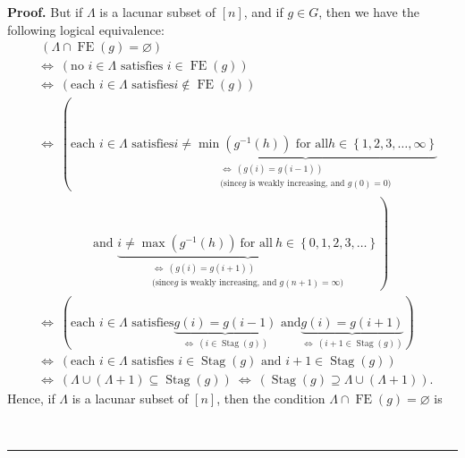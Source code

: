 \documentclass[numbers=enddot,12pt,final,onecolumn,notitlepage]{scrartcl}%
\theoremstyle{definition}
\newenvironment{proof}[1][Proof]{\noindent\textbf{#1.} }{\ \rule{0.5em}{0.5em}}
\begin{document}
\begin{proof}
But if $\Lambda$ is a lacunar subset of $\left[  n\right]  $, and if $g\in G$,
then we have the following logical equivalence:%
\begin{align*}
&  \ \left(  \Lambda\cap\operatorname*{FE}\left(  g\right)  =\varnothing
\right) \\
&  \Longleftrightarrow\ \left(  \text{no }i\in\Lambda\text{ satisfies }%
i\in\operatorname*{FE}\left(  g\right)  \right) \\
&  \Longleftrightarrow\ \left(  \text{each }i\in\Lambda\text{ satisfies
}i\notin\operatorname*{FE}\left(  g\right)  \right) \\
&  \Longleftrightarrow\ \left(  \text{each }i\in\Lambda\text{ satisfies
}\underbrace{i\neq\min\left(  g^{-1}\left(  h\right)  \right)  \text{ for all
}h\in\left\{  1,2,3,\ldots,\infty\right\}  }_{\substack{\Longleftrightarrow
\ \left(  g\left(  i\right)  =g\left(  i-1\right)  \right)  \\\text{(since
}g\text{ is weakly increasing, and }g\left(  0\right)  =0\text{)}}}\right. \\
&  \ \ \ \ \ \ \ \ \ \ \ \ \ \ \ \ \ \ \ \ \left.  \text{and }%
\underbrace{i\neq\max\left(  g^{-1}\left(  h\right)  \right)  \ \text{for
all}\ h\in\left\{  0,1,2,3,\ldots\right\}  }_{\substack{\Longleftrightarrow
\ \left(  g\left(  i\right)  =g\left(  i+1\right)  \right)  \\\text{(since
}g\text{ is weakly increasing, and }g\left(  n+1\right)  =\infty\text{)}%
}}\right) \\
&  \Longleftrightarrow\ \left(  \text{each }i\in\Lambda\text{ satisfies
}\underbrace{g\left(  i\right)  =g\left(  i-1\right)  }_{\Longleftrightarrow
\ \left(  i\in\operatorname*{Stag}\left(  g\right)  \right)  }\text{ and
}\underbrace{g\left(  i\right)  =g\left(  i+1\right)  }_{\Longleftrightarrow
\ \left(  i+1\in\operatorname*{Stag}\left(  g\right)  \right)  }\right) \\
&  \Longleftrightarrow\ \left(  \text{each }i\in\Lambda\text{ satisfies }%
i\in\operatorname*{Stag}\left(  g\right)  \text{ and }i+1\in
\operatorname*{Stag}\left(  g\right)  \right) \\
&  \Longleftrightarrow\ \left(  \Lambda\cup\left(  \Lambda+1\right)
\subseteq\operatorname*{Stag}\left(  g\right)  \right)  \ \Longleftrightarrow
\ \left(  \operatorname*{Stag}\left(  g\right)  \supseteq\Lambda\cup\left(
\Lambda+1\right)  \right)  .
\end{align*}
Hence, if $\Lambda$ is a lacunar subset of $\left[  n\right]  $, then the
condition $\Lambda\cap\operatorname*{FE}\left(  g\right)  =\varnothing$ is

\end{proof}
\end{document}
